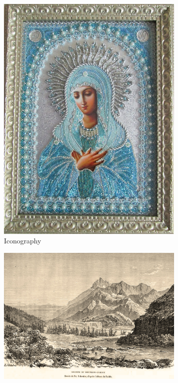 \begin{figure}[H]
\begin{subfigure}[t]{0.3\textwidth}
        \includegraphics[width=\linewidth]{imagenes/dataset_examples/iconography.jpg}
        \caption*{Iconography}
    \end{subfigure}
    \begin{subfigure}[t]{0.3\textwidth}
        \centering
        \includegraphics[width=\linewidth]{imagenes/dataset_examples/engraving.jpg}

\end{subfigure}
\end{figure}
